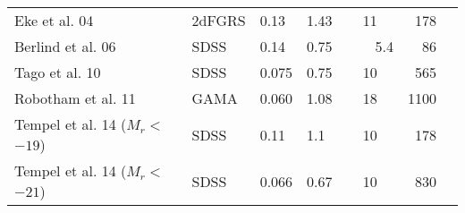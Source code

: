 \begin{frame}
\begin{columns}
\begin{column}{0.5\textwidth}
\begin{adjustbox}{max width=\linewidth}
\begin{tabular}{llllcrl}
                    Eke et al. 04           & 2dFGRS  & 0.13  & 1.43  & 11
                        & 178\\
                    Berlind et al. 06       & SDSS    & 0.14  & 0.75
                        & \ \ \ \ 5.4 & 86\\
                    Tago et al. 10          & SDSS    & 0.075  & 0.75  & 10
                        & 565 \\
                    Robotham et al. 11      & GAMA    & 0.060  & 1.08  & 18
                        & 1100\\
                    Tempel et al. 14 ($M_r$$<$$-19$)        & SDSS    & 0.11
                        & 1.1 & 10 & 178 \\
                    Tempel et al. 14 ($M_r$$<$$-21$)        & SDSS    & 0.066
                        & 0.67 & 10 & 830 \\
                    \bottomrule%
                \end{tabular}
            \end{adjustbox}
        \end{column}
    \end{columns}
\end{frame}

